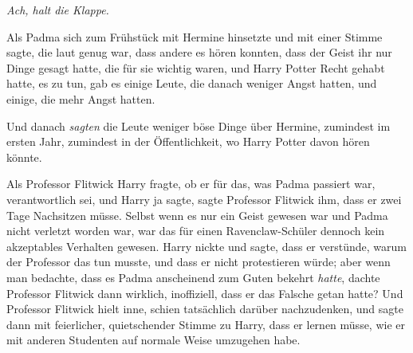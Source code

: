 \emph{Ach, halt die Klappe.}

\later

Als Padma sich zum Frühstück mit Hermine hinsetzte und mit einer Stimme sagte, die laut genug war, dass andere es hören konnten, dass der Geist ihr nur Dinge gesagt hatte, die für sie wichtig waren, und Harry Potter Recht gehabt hatte, es zu tun, gab es einige Leute, die danach weniger Angst hatten, und einige, die mehr Angst hatten.

Und danach \emph{sagten} die Leute weniger böse Dinge über Hermine, zumindest im ersten Jahr, zumindest in der Öffentlichkeit, wo Harry Potter davon hören könnte.

Als Professor Flitwick Harry fragte, ob er für das, was Padma passiert war, verantwortlich sei, und Harry ja sagte, sagte Professor Flitwick ihm, dass er zwei Tage Nachsitzen müsse. Selbst wenn es nur ein Geist gewesen war und Padma nicht verletzt worden war, war das für einen Ravenclaw-Schüler dennoch kein akzeptables Verhalten gewesen. Harry nickte und sagte, dass er verstünde, warum der Professor das tun musste, und dass er nicht protestieren würde; aber wenn man bedachte, dass es Padma anscheinend zum Guten bekehrt \emph{hatte}, dachte Professor Flitwick dann wirklich, inoffiziell, dass er das Falsche getan hatte? Und Professor Flitwick hielt inne, schien tatsächlich darüber nachzudenken, und sagte dann mit feierlicher, quietschender Stimme zu Harry, dass er lernen müsse, wie er mit anderen Studenten auf normale Weise umzugehen habe.

